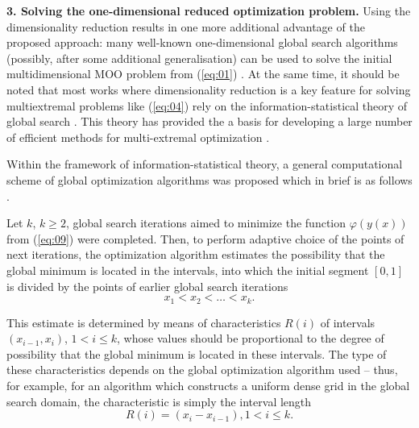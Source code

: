 \documentclass[runningheads]{llncs}
\begin{document}
\textbf{3. Solving the one-dimensional reduced optimization problem.} Using the dimensionality reduction results in one more additional advantage of the proposed approach: many well-known one-dimensional global search algorithms (possibly, after some additional generalisation) can be used to solve the initial multidimensional MOO problem from (\ref{eq:01}) \cite{c22,c23,c24,c25,c26,c27,c28,c29}. At the same time, it should be noted that most works where dimensionality reduction is a key feature for solving multiextremal problems like (\ref{eq:04}) rely on the information-statistical theory of global search \cite{c15}. This theory has provided the a basis for developing a large number of efficient methods for multi-extremal optimization \cite{c28,c29,c30,c31,c32,c33,c34,c35,c36,c37}.

Within the framework of information-statistical theory, a general computational scheme of global optimization algorithms was proposed which in brief is as follows \cite{c15,c30,c35}.

Let $k$, $k \geq 2$, global search iterations aimed to minimize the function $\varphi(y(x))$ from (\ref{eq:09}) were completed. Then, to perform adaptive choice of the points of next iterations, the optimization algorithm estimates the possibility that the global minimum is located  in the intervals, into which the initial segment $[0,1]$ is divided by the points of earlier global search  iterations
\begin{equation}
\label{eq:11}
x_1<x_2< \dots <x_k.
\end{equation}

This estimate is determined by means of characteristics $R(i)$ of intervals $(x_{i-1},x_i)$, $1 < i \leq k$, whose values should be proportional to the degree of possibility that the global minimum is located  in these intervals. The type of these characteristics depends on the global optimization algorithm used -- thus, for example, for an algorithm which constructs a uniform dense grid in the global search domain, the characteristic is simply the interval length 
\begin{equation}
\label{eq:12}
R(i)=(x_i-x_{i-1}), 1 < i \leq k.
\end{equation}
\end{document}
